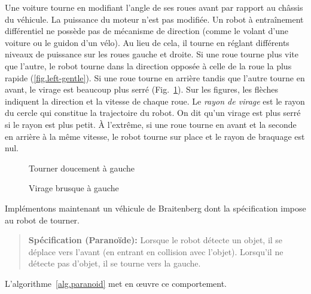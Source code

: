 {Une voiture tourne en modifiant l'angle de ses roues avant par rapport au châssis du véhicule. La puissance du moteur n'est pas modifiée. Un robot à entraînement différentiel ne possède pas de mécanisme de direction (comme le volant d'une voiture ou le guidon d'un vélo). Au lieu de cela, il tourne en réglant différents niveaux de puissance sur les roues gauche et droite. Si une roue tourne plus vite que l'autre, le robot tourne dans la direction opposée à celle de la roue la plus rapide (\ref{fig.left-gentle}). Si une roue tourne en arrière tandis que l'autre tourne en avant, le virage est beaucoup plus serré (Fig.~\ref{fig.left-sharp}). Sur les figures, les flèches indiquent la direction et la vitesse de chaque roue. Le \emph{rayon de virage} est le rayon du cercle qui constitue la trajectoire du robot. On dit qu'un virage est plus serré si le rayon est plus petit. À l'extrême, si une roue tourne en avant et la seconde en arrière à la même vitesse, le robot tourne sur place et le rayon de braquage est nul.

\begin{figure}
\begin{minipage}{.45\textwidth}
\caption{Tourner doucement à gauche}\label{fig.left-gentle}
\end{minipage}
\hspace{\fill}
\begin{minipage}{.45\textwidth}
\caption{Virage brusque à gauche}\label{fig.left-sharp}
\end{minipage}
\end{figure}

Implémentons maintenant un véhicule de Braitenberg dont la spécification impose au robot de tourner.

\begin{quote}
\normalsize\noindent\textbf{Spécification (Paranoïde):} Lorsque le robot détecte un objet, il se déplace vers l'avant (en entrant en collision avec l'objet). Lorsqu'il ne détecte pas d'objet, il se tourne vers la gauche.
\end{quote}
L'algorithme~\ref{alg.paranoid} met en œuvre ce comportement.

}
